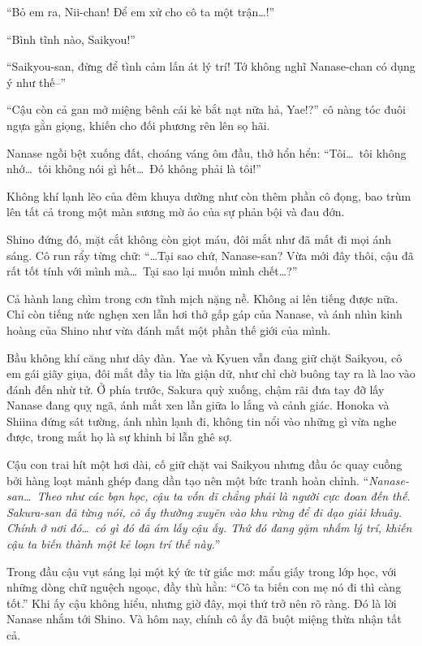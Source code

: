 \documentclass[../main.tex]{subfiles}
\begin{document}
``Bỏ em ra, Nii-chan! Để em xử cho cô ta một trận\dots!''

``Bình tĩnh nào, Saikyou!''

``Saikyou-san, đừng để tình cảm lấn át lý trí! Tớ không nghĩ Nanase-chan có dụng ý như thế--''

``Cậu còn cả gan mở miệng bênh cái kẻ bắt nạt nữa hả, Yae!?'' cô nàng tóc đuôi ngựa gằn giọng, khiến cho đối phương rên lên sọ hãi.

Nanase ngồi bệt xuống đất, choáng váng ôm đầu, thở hổn hển: ``Tôi\dots\ tôi không nhớ\dots\ tôi không nói gì hết\dots\ Đó không phải là tôi!''

Không khí lạnh lẽo của đêm khuya dường như còn thêm phần cô đọng, bao trùm lên tất cả trong một màn sương mờ ảo của sự phản bội và đau đớn.

Shino đứng đó, mặt cắt không còn giọt máu, đôi mắt như đã mất đi mọi ánh sáng. Cô run rẩy từng chữ: ``\dots Tại sao chứ, Nanase-san? Vừa mới đây thôi, cậu đã rất tốt tính với mình mà\dots\ Tại sao lại muốn mình chết\dots?''


Cả hành lang chìm trong cơn tĩnh mịch nặng nề. Không ai lên tiếng được nữa. Chỉ còn tiếng nức nghẹn xen lẫn hơi thở gấp gáp của Nanase, và ánh nhìn kinh hoàng của Shino như vừa đánh mất một phần thế giới của mình.

Bầu không khí căng như dây đàn. Yae và Kyuen vẫn đang giữ chặt Saikyou, cô em gái giãy giụa, đôi mắt đầy tia lửa giận dữ, như chỉ chờ buông tay ra là lao vào đánh đến nhừ tử. Ở phía trước, Sakura quỳ xuống, chậm rãi đưa tay đỡ lấy Nanase đang quỵ ngã, ánh mắt xen lẫn giữa lo lắng và cảnh giác. Honoka và Shiina đứng sát tường, ánh nhìn lạnh đi, không tin nổi vào những gì vừa nghe được, trong mắt họ là sự khinh bỉ lẫn ghê sợ.

Cậu con trai hít một hơi dài, cố giữ chặt vai Saikyou nhưng đầu óc quay cuồng bởi hàng loạt mảnh ghép đang dần tạo nên một bức tranh hoàn chỉnh. ``\textit{Nanase-san\dots\ Theo như các bạn học, cậu ta vốn dĩ chẳng phải là người cực đoan đến thế. Sakura-san đã từng nói, cô ấy thường xuyên vào khu rừng để đi dạo giải khuây. Chính ở nơi đó\dots\ có gì đó đã ám lấy cậu ấy. Thứ đó đang gặm nhấm lý trí, khiến cậu ta biến thành một kẻ loạn trí thế này.}''

Trong đầu cậu vụt sáng lại một ký ức từ giấc mơ: mẩu giấy trong lớp học, với những dòng chữ nguệch ngoạc, đầy thù hằn: ``Cô ta biến con mẹ nó đi thì càng tốt.'' Khi ấy cậu không hiểu, nhưng giờ đây, mọi thứ trở nên rõ ràng. Đó là lời Nanase nhắm tới Shino. Và hôm nay, chính cô ấy đã buột miệng thừa nhận tất cả.
\end{document}
